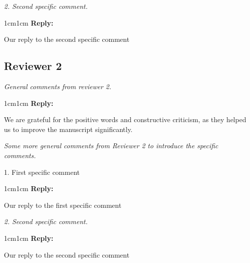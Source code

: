 \documentclass[rightcolwidth=.38]{ugent-note}
\newenvironment{reviewer}{\itshape}{}
\newenvironment{reply}{%
    \begin{adjustwidth}{1cm}{1cm}%
    \color{grayreply}\textbf{Reply:\ }%
    \ignorespaces%
}{\end{adjustwidth}}
\begin{document}
\begin{minipage}{\linewidth}
    \begin{reviewer}
        2. Second specific comment.
    \end{reviewer}

    \begin{reply}
        Our reply to the second specific comment
    \end{reply}
\end{minipage}

\subsection*{Reviewer 2}

\begin{minipage}{\linewidth}
    \begin{reviewer}
        General comments from reviewer 2.
    \end{reviewer}

    \begin{reply}
        We are grateful for the positive words and constructive criticism, as they helped us to improve the manuscript significantly.
    \end{reply}
\end{minipage}


\begin{minipage}{\linewidth}
    \begin{reviewer}
        Some more general comments from Reviewer 2 to introduce the specific comments.

        1. First specific comment
    \end{reviewer}

    \begin{reply}
        Our reply to the first specific comment
    \end{reply}
\end{minipage}


\begin{minipage}{\linewidth}
    \begin{reviewer}
        2. Second specific comment.
    \end{reviewer}

    \begin{reply}
        Our reply to the second specific comment
    \end{reply}
\end{minipage}
\end{document}
